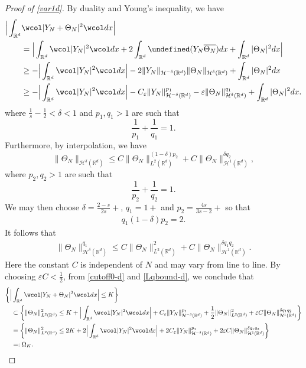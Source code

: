 \documentclass[%
11pt,  reqno]{amsart}
\theoremstyle{remarkstyle}
\newcommand{\1}{\hspace{0.2mm}\text{I}\hspace{0.2mm}}
\newcommand{\R}{\mathbb{R}}
\let\Re=\undefined\DeclareMathOperator*{\Re}{Re}
\newcommand{\eps}{\varepsilon}
\newcommand{\wick}[1]{\wcol#1\wcol}
\renewcommand{\O}{\Omega}
\numberwithin{equation}{section}
\numberwithin{theorem}{section}
\begin{document}
	\begin{proof}[Proof of \eqref{var1d}]
		By duality and Young's inequality, we have
		\begin{align}
			\begin{aligned}
				\Big| \int_{\R^d} & \wick{| Y_N + \Theta_N|^2} dx \Big|  \\
				& = \Big| \int_{\R^d} \wick{|Y_N|^2}  dx  + 2 \int_{\R^d} \Re( Y_N \overline{\Theta_N})  dx + \int_{\R^d} |\Theta_N|^2 dx \Big| \\
				& \ge -\Big| \int_{\R^d} \wick{|Y_N|^2}  dx \Big|  - 2 \|Y_N \|_{\mathcal H^{-\delta}(\R^d)} \| \Theta_N \|_{\mathcal H^\delta(\R^d)} + \int_{\R^d}  |\Theta_N|^2 dx\\
				& \geq  -\Big| \int_{\R^d} \wick{|Y_N|^2}  dx \Big|  - C_\eps \| Y_N \|_{\mathcal H^{-\delta}(\R^d)}^{p_1} -  \eps \| \Theta_N \|_{\mathcal H^\delta(\R^d)}^{q_1} + \int_{\R^d} |\Theta_N|^2  dx.
			\end{aligned}
			\label{cutoff0-d}
		\end{align}
		where $\frac{1}{s}-\frac{1}{2}<\delta<1$ and $p_1, q_1 > 1$ are such that
		\[
		\frac{1}{p_1} + \frac{1}{q_1} = 1.
		\]
		Furthermore, by interpolation, we have 
		\[
		\|\Theta_N\|_{\mathcal H^\delta(\R^d)}
		\leq  C  \| \Theta_N \|_{L^2(\R^d)}^{(1-\delta)p_2} +  C \| \Theta_N \|_{\mathcal H^1(\R^d)}^{\delta q_2},
		\]
		where $p_2, q_2 > 1$ are such that
		\[
		\frac{1}{p_2} + \frac{1}{q_2} = 1.
		\]
		We may then choose $ \delta =\frac{2-s}{2s}+$, $q_1 = 1+$ and $p_2 = \frac{4s}{3s-2}+$ so that
		\begin{align} \label{choiexpo-d}
			q_1(1-\delta)p_2 = 2.
		\end{align}	
		It follows that
		\begin{align}
			\label{Lqbound-d}
			\| \Theta_N \|_{\mathcal H^\delta(\R^d)}^{q_1} 
			\leq   C \| \Theta_N \|_{L^2(\R^d)}^{2} +  C \| \Theta_N \|_{\mathcal H^1(\R^d)}^{\delta q_1 q_2}.
		\end{align}
		Here the constant $C$ is independent of $N$ and may vary from line to line. By choosing $\eps C <\frac{1}{2}$, from \eqref{cutoff0-d} and \eqref{Lqbound-d}, we conclude that
		\begin{align}
			&\bigg\{  \Big| \int_{\R^d}  \wick{| Y_N + \Theta_N|^2} dx \Big|   \leq K \bigg\}  \notag\\
			&\quad \subset \bigg\{  \|\Theta_N\|_{L^2(\R^d)}^2 \leq   K + \Big| \int_{\R^d} \wick{ |Y_N|^2 }  dx   \Big| + C_\eps \| Y_N \|_{\mathcal H^{-\delta}(\R^d)}^{p_1}  + \frac{1}{2} \| \Theta_N \|_{L^2(\R^d)}^{2} + \eps C  \| \Theta_N \|_{\mathcal H^1(\R^d)}^{\delta q_1 q_2} \bigg\} \notag\\
			&\quad = \bigg\{  \|\Theta_N \|_{L^2(\R^d)}^2 \leq  2 K + 2 \Big| \int_{\R^d} \wick{ |Y_N|^2 }  dx   \Big| + 2 C_\eps \| Y_N \|_{\mathcal H^{-\delta}(\R^d)}^{p_1}   + 2 \eps C \| \Theta_N \|_{\mathcal H^1(\R^d)}^{\delta q_1 q_2} \bigg\} \notag \\
			&\quad  = : \O_K.
			\label{cutoff1-d}
		\end{align}
		

\end{proof}
\end{document}
